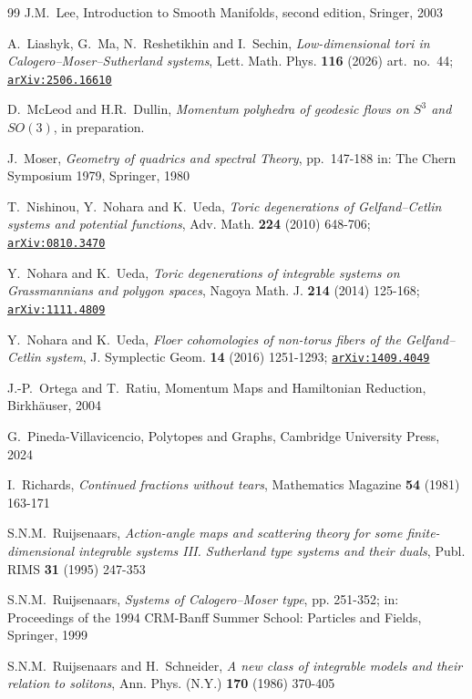 \documentclass[a4paper,11pt,reqno]{amsart}
\theoremstyle{definition}
\numberwithin{equation}{section}
\begin{document}
\begin{thebibliography}{99}
J.M.~Lee,
Introduction to Smooth Manifolds, second edition, Sringer, 2003

 A.~Liashyk, G.~Ma, N.~Reshetikhin and I.~Sechin,
{\it Low-dimensional tori in Calogero--Moser--Sutherland systems},
Lett. Math. Phys. {\bf 116} (2026) art.~no.~44;
  \href{https://arxiv.org/abs/2506.16610}{\tt arXiv:2506.16610}

D.~McLeod and H.R.~Dullin,
{\it   Momentum polyhedra of geodesic flows on $S^3$ and $SO(3)$},
in preparation.

J.~Moser,
{\it Geometry of quadrics and spectral Theory},
pp.~147-188 in: The Chern Symposium 1979, Springer, 1980

T.~Nishinou, Y.~Nohara and K.~Ueda,
\emph{Toric degenerations of Gelfand--Cetlin systems and potential functions},
Adv. Math. {\bf 224} (2010) 648-706;
\href{https://arxiv.org/abs/0810.3470}{\tt arXiv:0810.3470}

Y.~Nohara and K.~Ueda,
{\it  Toric degenerations of integrable systems on Grassmannians and polygon spaces},
 Nagoya Math. J. {\bf 214} (2014) 125-168;
\href{https://arxiv.org/abs/1111.4809}{\tt arXiv:1111.4809}

Y.~Nohara and K.~Ueda,
{\it Floer cohomologies of non-torus fibers of the Gelfand--Cetlin
system}, J. Symplectic Geom.  {\bf 14} (2016) 1251-1293;
\href{https://arxiv.org/abs/1409.4049}{\tt arXiv:1409.4049}

J.-P.~Ortega and T.~Ratiu, Momentum Maps and Hamiltonian Reduction, Birkh\"auser, 2004

G.~Pineda-Villavicencio,
Polytopes and Graphs,
Cambridge University Press, 2024

I.~Richards,
{\it Continued fractions without tears},
Mathematics Magazine {\bf 54} (1981) 163-171

S.N.M.~Ruijsenaars,
{\it  Action-angle maps and scattering theory for some finite-dimensional
integrable systems III. Sutherland type systems and their duals},
 Publ. RIMS {\bf 31} (1995) 247-353

S.N.M.~Ruijsenaars,
{\it Systems of Calogero--Moser type}, pp. 251-352;
in: Proceedings of the 1994 CRM-Banff Summer School: Particles and Fields, Springer, 1999

S.N.M.~Ruijsenaars and H.~Schneider,
{\it A new class of integrable models and their relation to
solitons},  Ann. Phys. (N.Y.) {\bf 170} (1986)  370-405


\end{thebibliography}
\end{document}
